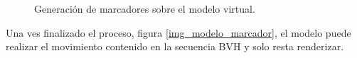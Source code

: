  \begin{figure}[H]
   \centering 
    \hspace{0.6cm}
   \caption{Generación de marcadores sobre el modelo virtual.}   
 \end{figure}  
 
Una ves finalizado el proceso, figura \ref{img_modelo_marcador},  el modelo puede realizar el movimiento contenido en la secuencia BVH y solo resta renderizar. 

